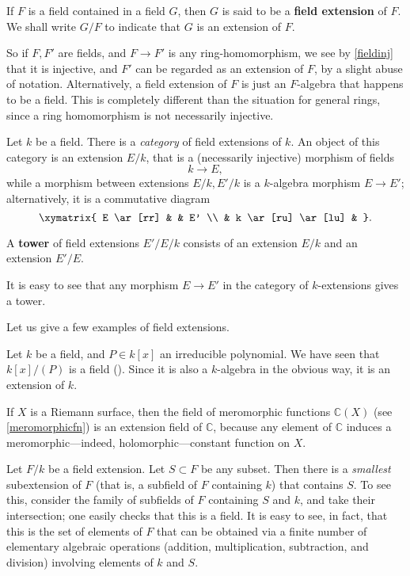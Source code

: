 \begin{definition} If $F$ is a field contained in a field $G$, then $G$ is said
to be a \textbf{field extension} of $F$. We shall write $G/F$ to indicate
that  $G$ is an extension of $F$.
\end{definition}

So if $F, F'$ are fields, and $F \to F'$ is any ring-homomorphism, we see by 
\cref{fieldinj} that it is injective, and $F'$ can be regarded as an extension
of $F$, by a slight abuse of notation. Alternatively, a field extension of $F$
is just an $F$-algebra that happens to be a field.
This is completely different than the situation for general rings, since a
ring homomorphism is not necessarily injective. 

Let $k$ be a field. There is a \emph{category} of field extensions of $k$. 
An object of this category is an extension $E/k$, that is a
(necessarily injective) morphism of fields
\[ k \to E,  \]
while a morphism between extensions $E/k, E'/k$ is a $k$-algebra morphism $E \to E'$;
alternatively, it is a commutative diagram
\[ \xymatrix{
E \ar[rr] & & E' \\
& k \ar[ru] \ar[lu] &
}.\]


\begin{definition} 
A \textbf{tower} of field extensions $E'/E/k$ consists of an extension $E/k$
and an extension $E'/E$.
\end{definition} 

It is easy to see that any morphism $E \to E'$ in the category of
$k$-extensions gives a tower. 


Let us give a few examples of field extensions.

\begin{example} 
Let $k$ be a field, and $P \in k[x]$ an irreducible polynomial. We have seen
that $k[x]/(P)$ is a field (). Since it is also a $k$-algebra
in the obvious way, it is an extension of $k$.
\end{example} 

\begin{example} 
If $X$ is a Riemann surface, then the field of meromorphic functions
$\mathbb{C}(X)$ (see \cref{meromorphicfn}) is an extension field of
$\mathbb{C}$, because any element of $\mathbb{C}$ induces a
meromorphic---indeed, holomorphic---constant function on $X$.
\end{example} 

Let $F/k$ be a field extension. Let $S \subset F$ be any subset. 
Then there is a  \emph{smallest} subextension of $F$ (that is, a subfield of $F$ containing $k$) 
that contains $S$.
To see this, consider the family of subfields of $F $ containing $S$ and
$k$, and take their intersection; one easily checks that this is a field.
It is easy to see, in fact, that this is the set of elements of $F$ that can
be obtained via  a finite number of elementary algebraic operations
(addition, multiplication, subtraction, and division) involving elements of
$k$ and $S$.

